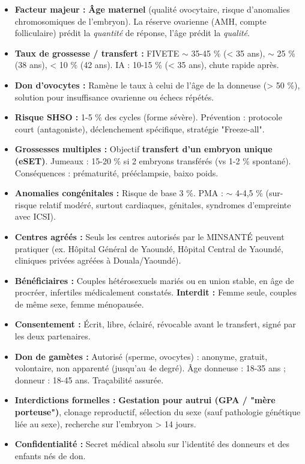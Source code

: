 \documentclass[11pt]{article}
\begin{document}
\begin{aretenir}
\begin{itemize}
    \item \textbf{Facteur majeur :} \textbf{Âge maternel} (qualité ovocytaire, risque d'anomalies chromosomiques de l'embryon). La réserve ovarienne (AMH, compte folliculaire) prédit la \emph{quantité} de réponse, l'âge prédit la \emph{qualité}.
    \item \textbf{Taux de grossesse / transfert :} FIVETE $\sim$ 35-45 \% (< 35 ans), $\sim$ 25 \% (38 ans), < 10 \% (42 ans). IA : 10-15 \% (< 35 ans), chute rapide après.
    \item \textbf{Don d'ovocytes :} Ramène le taux à celui de l'âge de la donneuse (> 50 \%), solution pour insuffisance ovarienne ou échecs répétés.
    \item \textbf{Risque SHSO :} 1-5 \% des cycles (forme sévère). Prévention : protocole court (antagoniste), déclenchement spécifique, stratégie "Freeze-all".
    \item \textbf{Grossesses multiples :} Objectif \textbf{transfert d'un embryon unique (eSET)}. Jumeaux : 15-20 \% si 2 embryons transférés (vs 1-2 \% spontané). Conséquences : prématurité, prééclampsie, baixo poids.
    \item \textbf{Anomalies congénitales :} Risque de base 3 \%. PMA : $\sim$ 4-4,5 \% (sur-risque relatif modéré, surtout cardiaques, génitales, syndromes d'empreinte avec ICSI).
\end{itemize}
\end{aretenir}

\begin{savaistu}
\begin{itemize}
    \item \textbf{Centres agréés :} Seuls les centres autorisés par le MINSANTÉ peuvent pratiquer (ex. Hôpital Général de Yaoundé, Hôpital Central de Yaoundé, cliniques privées agréées à Douala/Yaoundé).
    \item \textbf{Bénéficiaires :} Couples hétérosexuels mariés ou en union stable, en âge de procréer, infertiles médicalement constatés. \textbf{Interdit :} Femme seule, couples de même sexe, femme ménopausée.
    \item \textbf{Consentement :} Écrit, libre, éclairé, révocable avant le transfert, signé par les deux partenaires.
    \item \textbf{Don de gamètes :} Autorisé (sperme, ovocytes) : anonyme, gratuit, volontaire, non apparenté (jusqu'au 4e degré). Âge donneuse : 18-35 ans ; donneur : 18-45 ans. Traçabilité assurée.
    \item \textbf{Interdictions formelles :} \textbf{Gestation pour autrui (GPA / "mère porteuse")}, clonage reproductif, sélection du sexe (sauf pathologie génétique liée au sexe), recherche sur l'embryon > 14 jours.
    \item \textbf{Confidentialité :} Secret médical absolu sur l'identité des donneurs et des enfants nés de don.
\end{itemize}
\end{savaistu}
\end{document}
